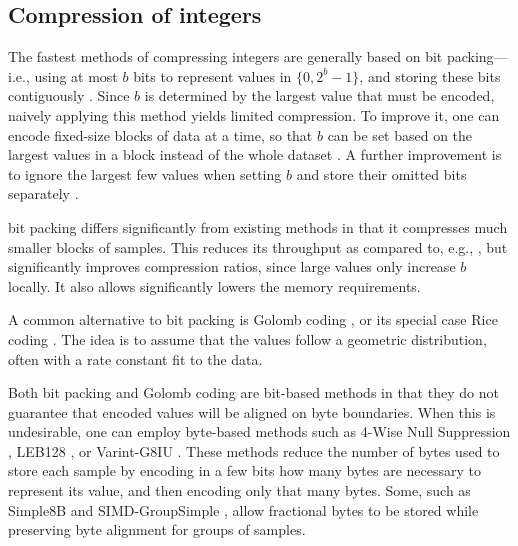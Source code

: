 

\subsection{Compression of integers}


The fastest methods of compressing integers are generally based on bit packing---i.e., using at most $b$ bits to represent values in $\{0, 2^b-1\}$, and storing these bits contiguously \cite{bbp, pfor, fastpfor}. Since $b$ is determined by the largest value that must be encoded, naively applying this method yields limited compression. To improve it, one can encode fixed-size blocks of data at a time, so that $b$ can be set based on the largest values in a block instead of the whole dataset \cite{kGamma, pfor, fastpfor}. A further improvement is to ignore the largest few values when setting $b$ and store their omitted bits separately \cite{pfor, fastpfor}.

\minesp bit packing differs significantly from existing methods in that it compresses much smaller blocks of samples. This reduces its throughput as compared to, e.g., \cite{fastpfor}, but significantly improves compression ratios, since large values only increase $b$ locally. It also allows significantly lowers the memory requirements.

A common \cite{flac, shorten} alternative to bit packing is Golomb coding \cite{golomb}, or its special case Rice coding \cite{rice}. The idea is to assume that the values follow a geometric distribution, often with a rate constant fit to the data. %

Both bit packing and Golomb coding are bit-based methods in that they do not guarantee that encoded values will be aligned on byte boundaries. When this is undesirable, one can employ byte-based methods such as 4-Wise Null Suppression \cite{kGamma}, LEB128 \cite{dwarf}, or Varint-G8IU \cite{varintG8IU}. These methods reduce the number of bytes used to store each sample by encoding in a few bits how many bytes are necessary to represent its value, and then encoding only that many bytes. Some, such as Simple8B \cite{simple8b} and SIMD-GroupSimple \cite{groupSimd}, allow fractional bytes to be stored while preserving byte alignment for groups of samples. %

